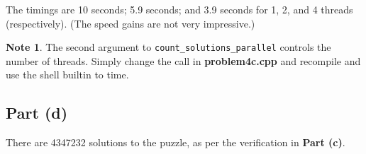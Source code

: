 \documentclass{article}
\theoremstyle{definition}
\newtheorem*{note}{Note}
\begin{document}
The timings are 10 seconds; 5.9 seconds; and 3.9 seconds for 1, 2, and 4 threads
(respectively). (The speed gains are not very impressive.)

\begin{note}
The second argument to \texttt{count\_solutions\_parallel} controls the number
of threads. Simply change the call in \textbf{problem4c.cpp} and recompile
and use the shell builtin to time.
\end{note}


\subsection{Part (d)}
There are 4347232 solutions to the puzzle,
as per the verification in \textbf{Part (c)}.
\end{document}
